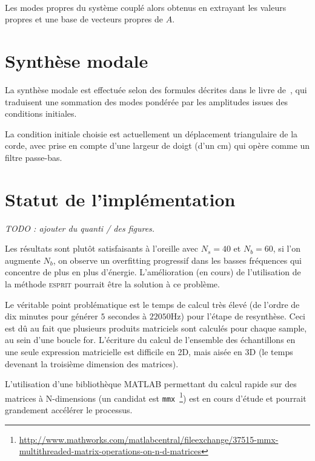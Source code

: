 \documentclass[a4paper,10pt]{article}
\begin{document}
\paragraph{}
  Les modes propres du système couplé alors obtenus en extrayant les valeurs
propres et une base de vecteurs propres de \( A \).

\section{Synthèse modale}

  La synthèse modale est effectuée selon des formules décrites
dans le livre de~\textcite{newland}, qui traduisent une sommation des modes
pondérée par les amplitudes issues des conditions initiales.

  La condition initiale choisie est actuellement un déplacement triangulaire
de la corde, avec prise en compte d'une largeur de doigt (d'un \( \si{\cm} \))
qui opère comme un filtre passe-bas.

\section{Statut de l'implémentation}

  \emph{TODO : ajouter du quanti / des figures.}
  
  Les résultats sont plutôt satisfaisants à l'oreille avec \( N_s = 40 \) et
\( N_b = 60 \), si l'on augmente \( N_b \), on observe un overfitting
progressif dans les basses fréquences qui concentre de plus en plus d'énergie.
L'amélioration (en cours) de l'utilisation de la méthode \textsc{esprit}
pourrait être la solution à ce problème.

Le véritable point problématique est le temps de calcul très élevé (de l'ordre
de dix minutes pour générer \( 5 \) secondes à \( \si{22050\hertz{}} \))
pour l'étape de resynthèse. Ceci est dû au fait que plusieurs produits
matriciels sont calculés pour chaque sample, au sein d'une boucle for.
L'écriture du calcul de l'ensemble des échantillons en une seule expression
matricielle est difficile en 2D, mais aisée en 3D (le temps devenant la
troisième dimension des matrices).

  L'utilisation d'une bibliothèque MATLAB permettant du calcul rapide sur
des matrices à N-dimensions (un candidat est
\texttt{mmx}~\footnote{%
\url{http://www.mathworks.com/matlabcentral/fileexchange/37515-mmx-multithreaded-matrix-operations-on-n-d-matrices}})
est en cours d'étude et pourrait grandement accélérer le processus.

\printbibliography{}
\end{document}
